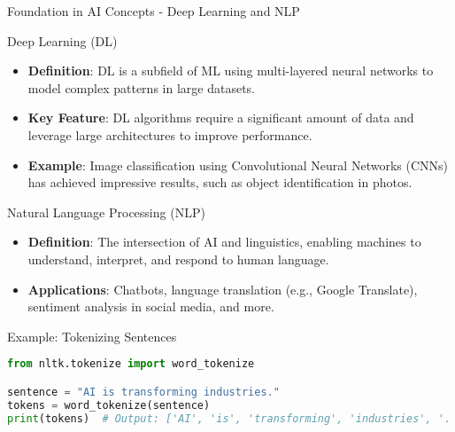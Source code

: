 \documentclass[aspectratio=169]{beamer}
\begin{document}
\begin{frame}[fragile]{Foundation in AI Concepts - Deep Learning and NLP}
    \begin{block}{Deep Learning (DL)}
        \begin{itemize}
            \item \textbf{Definition}: DL is a subfield of ML using multi-layered neural networks to model complex patterns in large datasets.
            \item \textbf{Key Feature}: DL algorithms require a significant amount of data and leverage large architectures to improve performance.
            \item \textbf{Example}: Image classification using Convolutional Neural Networks (CNNs) has achieved impressive results, such as object identification in photos.
        \end{itemize}
    \end{block}

    \begin{block}{Natural Language Processing (NLP)}
        \begin{itemize}
            \item \textbf{Definition}: The intersection of AI and linguistics, enabling machines to understand, interpret, and respond to human language.
            \item \textbf{Applications}: Chatbots, language translation (e.g., Google Translate), sentiment analysis in social media, and more.
        \end{itemize}
    \end{block}
    
    \begin{block}{Example: Tokenizing Sentences}
    \begin{lstlisting}[language=Python]
from nltk.tokenize import word_tokenize

sentence = "AI is transforming industries."
tokens = word_tokenize(sentence)
print(tokens)  # Output: ['AI', 'is', 'transforming', 'industries', '.']
    \end{lstlisting}
    \end{block}
\end{frame}
\end{document}
